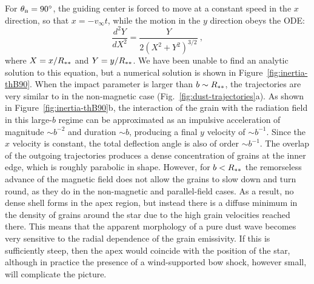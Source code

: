 For \(\theta_{\scriptscriptstyle\text{B}} = \ang{90}\), the guiding center is forced to move at a
constant speed in the \(x\) direction, so that \(x = -v_\infty t\), while
the motion in the \(y\) direction obeys the ODE:
\begin{equation}
  \label{eq:ode-perp-bfield}
  \frac{d^2 Y}{d X^2} = \frac{Y}{2 \left( X^2 + Y^2\right)^{3/2}} \ ,
\end{equation}
where \(X = x / R_{**}\) and \(Y = y / R_{**}\).  We have been
unable to find an analytic solution to this equation, but a numerical
solution is shown in Figure~\ref{fig:inertia-thB90}.  When the impact
parameter is larger than \(b \sim R_{**}\), the trajectories are very
similar to in the non-magnetic case
(Fig.~\ref{fig:dust-trajectories}a).  As shown in
Figure~\ref{fig:inertia-thB90}b, the interaction of the grain with the
radiation field in this large-\(b\) regime can be approximated as an
impulsive acceleration of magnitude \(\sim b^{-2}\) and duration
\(\sim b\), producing a final \(y\) velocity of \(\sim b^{-1}\).  Since the
\(x\) velocity is constant, the total deflection angle is also of
order \(\sim b^{-1}\).  The overlap of the outgoing trajectories produces
a dense concentration of grains at the inner edge, which is roughly
parabolic in shape.  However, for \(b < R_{**}\) the remorseless
advance of the magnetic field does not allow the grains to slow down
and turn round, as they do in the non-magnetic and parallel-field
cases.  As a result, no dense shell forms in the apex region, but
instead there is a diffuse minimum in the density of grains around the
star due to the high grain velocities reached there.  This means that
the apparent morphology of a pure dust wave becomes very sensitive to
the radial dependence of the grain emissivity.  If this is
sufficiently steep, then the apex would coincide with the position of
the star, although in practice the presence of a wind-supported bow
shock, however small, will complicate the picture.




